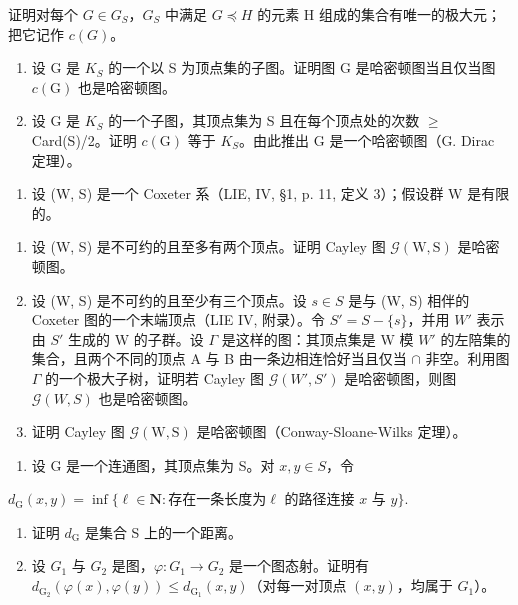   证明对每个 \(G \in G_{S}\)，\(G_{S}\) 中满足 \(G \preccurlyeq H\) 的元素 H 组成的集合有唯一的极大元；把它记作 \(c(G)\)。

\begin{enumerate}
\def\labelenumi{\alph{enumi})}
\setcounter{enumi}{2}
\item
  设 G 是 \(K_{S}\) 的一个以 S 为顶点集的子图。证明图 G 是哈密顿图当且仅当图 \(c(\mathrm{G})\) 也是哈密顿图。
\item
  设 G 是 \(K_{S}\) 的一个子图，其顶点集为 S 且在每个顶点处的次数 \(\geqslant\) Card(S)/2。证明 \(c(\mathrm{G})\) 等于 \(K_{S}\)。由此推出 G 是一个哈密顿图（G. Dirac 定理）。
\end{enumerate}

\begin{enumerate}
\def\labelenumi{\arabic{enumi})}
\setcounter{enumi}{8}
\tightlist
\item
  设 (W, S) 是一个 Coxeter 系（LIE, IV, §1, p. 11, 定义 3）；假设群 W 是有限的。
\end{enumerate}

\begin{enumerate}
\def\labelenumi{\alph{enumi})}
\item
  设 (W, S) 是不可约的且至多有两个顶点。证明 Cayley 图 \(\mathcal{G}(\mathrm{W},\mathrm{S})\) 是哈密顿图。
\item
  设 (W, S) 是不可约的且至少有三个顶点。设 \(s \in S\) 是与 (W, S) 相伴的 Coxeter 图的一个末端顶点（LIE IV, 附录）。令 \(S' = S - \{s\}\)，并用 \(W'\) 表示由 \(S'\) 生成的 W 的子群。设 \(\Gamma\) 是这样的图：其顶点集是 W 模 \(W'\) 的左陪集的集合，且两个不同的顶点 A 与 B 由一条边相连恰好当且仅当 \(\cap\) 非空。利用图 \(\Gamma\) 的一个极大子树，证明若 Cayley 图 \(\mathcal{G}(W', S')\) 是哈密顿图，则图 \(\mathcal{G}(W, S)\) 也是哈密顿图。
\item
  证明 Cayley 图 \(\mathcal{G}(\mathrm{W},\mathrm{S})\) 是哈密顿图（Conway-Sloane-Wilks 定理）。
\end{enumerate}

\begin{enumerate}
\def\labelenumi{\arabic{enumi})}
\setcounter{enumi}{9}
\tightlist
\item
  设 G 是一个连通图，其顶点集为 S。对 \(x, y \in S\)，令
\end{enumerate}

\(d_{\mathrm{G}}(x,y) = \inf \{\ell \in \mathbf{N}\colon \text{存在一条长度为} \ell \text{ 的路径连接 } x \text{ 与 } y\}.\)

\begin{enumerate}
\def\labelenumi{\alph{enumi})}
\item
  证明 \(d_{\mathrm{G}}\) 是集合 S 上的一个距离。
\item
  设 \(G_{1}\) 与 \(G_{2}\) 是图，\(\varphi\colon G_{1}\to G_{2}\) 是一个图态射。证明有 \(d_{\mathrm{G}_{2}}(\varphi(x),\varphi(y))\leqslant d_{\mathrm{G}_{1}}(x,y)\)（对每一对顶点 \((x,y)\)，均属于 \(G_{1}\)）。
\end{enumerate}

